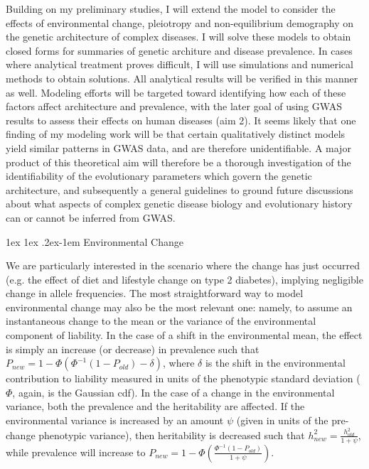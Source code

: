 \message{ !name(ResearchStrategy.tex)}\documentclass[11pt]{article}
\makeatletter
\renewcommand{\paragraph}{%
  \@startsection{paragraph}{4}%
  {\z@}{1ex \@plus 1ex \@minus .2ex}{-1em}%
  {\normalfont\normalsize\bfseries}%
}
\makeatother
\begin{document}
Building on my preliminary studies, I will extend the model to consider the effects of environmental change, pleiotropy and non-equilibrium demography on the genetic architecture of complex diseases. I will solve these models to obtain closed forms for summaries of genetic architure and disease prevalence. In cases where analytical treatment proves difficult, I will use simulations and numerical methods to obtain solutions. All analytical results will be verified in this manner as well. Modeling efforts will be targeted toward identifying how each of these factors affect architecture and prevalence, with the later goal of using GWAS results to assess their effects on human diseases (aim 2). It seems likely that one finding of my modeling work will be that certain qualitatively distinct models yield similar patterns in GWAS data, and are therefore unidentifiable. A major product of this theoretical aim will therefore be a thorough investigation of the identifiability of the evolutionary parameters which govern the genetic architecture, and subsequently a general guidelines to ground future discussions about what aspects of complex genetic disease biology and evolutionary history can or cannot be inferred from GWAS.

\paragraph{Environmental Change}

We are particularly interested in the scenario where the change has just occurred (e.g. the effect of diet and lifestyle change on type 2 diabetes), implying negligible change in allele frequencies. The most straightforward way to model environmental change may also be the most relevant one: namely, to assume an instantaneous change to the mean or the variance of the environmental component of liability. In the case of a shift in the environmental mean, the effect is simply an increase (or decrease) in prevalence such that $P_{new} = 1 - \Phi\left(\Phi^{-1}\left(1-P_{old}\right)-\delta\right)$, where $\delta$ is the shift in the environmental contribution to liability measured in units of the phenotypic standard deviation ($\Phi$, again, is the Gaussian cdf). In the case of a change in the environmental variance, both the prevalence and the heritability are affected. If the environmental variance is increased by an amount $\psi$ (given in units of the pre-change phenotypic variance), then heritability is decreased such that $h^2_{new} = \frac{h^2_{old}}{1+\psi}$, while prevalence will increase to $P_{new} = 1 - \Phi\left(\frac{\Phi^{-1}\left(1-P_{old}\right)}{1+\psi}\right)$.
\end{document}
